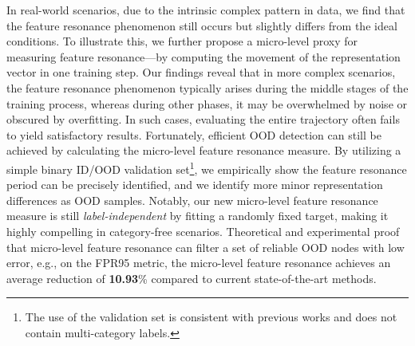 In real-world scenarios, due to the intrinsic complex pattern in data, we find that the feature resonance phenomenon still occurs but slightly differs from the ideal conditions. 
To illustrate this, we further propose a micro-level proxy for measuring feature resonance—by computing the movement of the representation vector in one training step.
Our findings reveal that in more complex scenarios, the feature resonance phenomenon typically arises during the middle stages of the training process, whereas during other phases, it may be overwhelmed by noise or obscured by overfitting. 
In such cases, evaluating the entire trajectory often fails to yield satisfactory results. 
Fortunately, efficient OOD detection can still be achieved by calculating the micro-level feature resonance measure.
By utilizing a simple binary ID/OOD validation set\footnote{The use of the validation set is consistent with previous works \citep{katz2022training, gong2024energy, du2024does, du2024haloscope} and does not contain multi-category labels.}, we empirically show the feature resonance period can be precisely identified, and we identify more minor representation differences as OOD samples.
Notably, our new micro-level feature resonance measure is still \textit{label-independent} by fitting a randomly fixed target, making it highly compelling in category-free scenarios. Theoretical and experimental proof that micro-level feature resonance can filter a set of reliable OOD nodes with low error, e.g., on the FPR95 metric, the micro-level feature resonance achieves an average reduction of \textbf{10.93}\% compared to current state-of-the-art methods.



